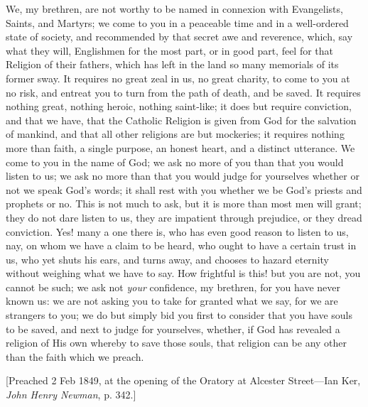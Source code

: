 We, my brethren, are not worthy to be named in connexion with
Evangelists, Saints, and Martyrs; we come to you in a peaceable time
and in a well-ordered state of society, and recommended by that secret
awe and reverence, which, say what they will, Englishmen for the most
part, or in good part, feel for that Religion of their fathers, which
has left in the land so many memorials of its former sway. It requires
no great zeal in us, no great charity, to come to you at no risk, and
entreat you to turn from the path of death, and be saved. It requires
nothing great, nothing heroic, nothing saint-like; it does but require
conviction, and that we have, that the Catholic Religion is given from
God for the salvation of mankind, and that all other religions are but
mockeries; it requires nothing more than faith, a single purpose, an
honest heart, and a distinct utterance. We come to you in the name of
God; we ask no more of you than that you would listen to us; we ask no
more than that you would judge for yourselves whether or not we speak
God's words; it shall rest with you whether we be God's priests and
prophets or no. This is not much to ask, but it is more than most men
will grant; they do not dare listen to us, they are impatient through
prejudice, or they dread conviction. Yes! many a one there is, who has
even good reason to listen to us, nay, on whom we have a claim to be
heard, who ought to have a certain trust in us, who yet shuts his
ears, and turns away, and chooses to hazard eternity without weighing
what we have to say. How frightful is this! but you are not, you
cannot be such; we ask not \emph{your} confidence, my brethren, for
you have never known us: we are not asking you to take for granted
what we say, for we are strangers to you; we do but simply bid you
first to consider that you have souls to be saved, and next to judge
for yourselves, whether, if God has revealed a religion of His own
whereby to save those souls, that religion can be any other than the
faith which we preach.

[Preached 2 Feb 1849, at the opening of the Oratory at Alcester
Street—Ian Ker, \emph{John Henry Newman}, p. 342.]


